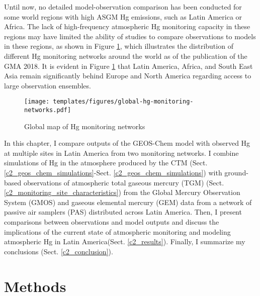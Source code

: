 \begin{flushleft}
Until now, no detailed model-observation comparison has been conducted for some world regions with high ASGM Hg emissions, such as Latin America or Africa. The lack of high-frequency atmospheric Hg monitoring capacity in these regions may have limited the ability of studies to compare observations to models in these regions, as shown in Figure \ref{fig:global-hg-monitoring-networks}, which illustrates the distribution of different Hg monitoring networks around the world as of the publication of the GMA 2018. It is evident in Figure \ref{fig:global-hg-monitoring-networks} that Latin America, Africa, and South East Asia remain significantly behind Europe and North America regarding access to large observation ensembles. 
\end{flushleft}

\begin{figure}[H]
  \texttt{[image: templates/figures/global-hg-monitoring-networks.pdf]}
  \caption[Global map of Hg monitoring networks]{Global map of Hg monitoring networks \cite{united_nations_environment_programme_technical_2019}}
  \label{fig:global-hg-monitoring-networks}
  \centering
  
\end{figure}
\FloatBarrier

\begin{flushleft}
 In this chapter, I compare outputs of the GEOS-Chem model with observed Hg at multiple sites in Latin America from two monitoring networks. I combine simulations of Hg in the atmosphere produced by the \gc CTM (Sect. \ref{c2_geos_chem_simulations}-Sect. \ref{c2_geos_chem_simulations}) with ground-based observations of atmospheric total gaseous mercury (TGM) (Sect. \ref{c2_monitoring_site_characteristics}) from the Global Mercury Observation System (GMOS)\cite{sprovieri_atmospheric_2016} and gaseous elemental mercury (GEM) data from a network of passive air samplers (PAS) distributed across Latin America. Then, I present comparisons between observations and model outputs and discuss the implications of the current state of atmospheric monitoring and modeling atmospheric Hg in Latin America(Sect. \ref{c2_results}). Finally, I summarize my conclusions (Sect. \ref{c2_conclusion}).
\end{flushleft}




\section{Methods}\label{c2_methods}
